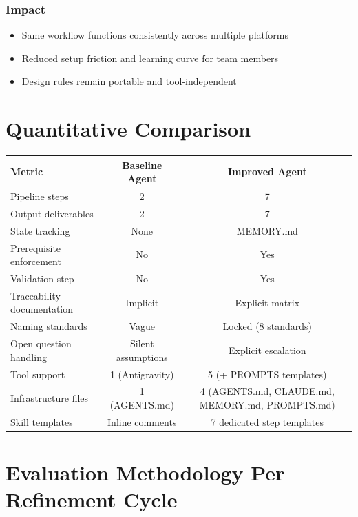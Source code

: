 \documentclass[12pt,a4paper]{article}
\begin{document}
\subsubsection{Impact}
\begin{itemize}
    \item Same workflow functions consistently across multiple platforms
    \item Reduced setup friction and learning curve for team members
    \item Design rules remain portable and tool-independent
\end{itemize}

\newpage

\section{Quantitative Comparison}

\begin{table}[h]
\centering
\begin{tabular}{|l|c|c|}
\hline
\textbf{Metric} & \textbf{Baseline Agent} & \textbf{Improved Agent} \\
\hline
Pipeline steps & 2 & 7 \\
\hline
Output deliverables & 2 & 7 \\
\hline
State tracking & None & MEMORY.md \\
\hline
Prerequisite enforcement & No & Yes \\
\hline
Validation step & No & Yes \\
\hline
Traceability documentation & Implicit & Explicit matrix \\
\hline
Naming standards & Vague & Locked (8 standards) \\
\hline
Open question handling & Silent assumptions & Explicit escalation \\
\hline
Tool support & 1 (Antigravity) & 5 (+ PROMPTS templates) \\
\hline
Infrastructure files & 1 (AGENTS.md) & 4 (AGENTS.md, CLAUDE.md, MEMORY.md, PROMPTS.md) \\
\hline
Skill templates & Inline comments & 7 dedicated step templates \\
\hline
\end{tabular}
\end{table}

\section{Evaluation Methodology Per Refinement Cycle}
\end{document}
